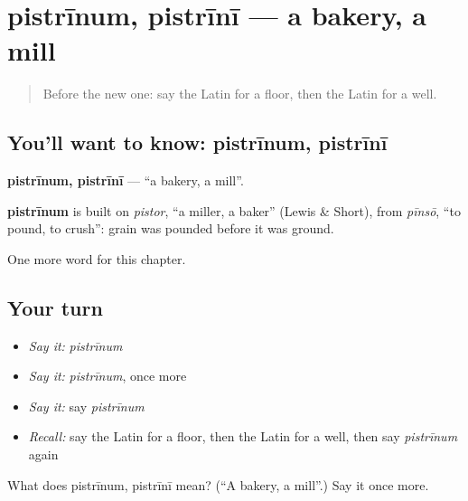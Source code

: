 \section[pistrīnum, pistrīnī]{pistrīnum, pistrīnī — a bakery, a mill}

\label{lesson:LA-C118-pistrinum}



\begin{quote}
Before the new one: say the Latin for a floor, then the Latin for a well.
\end{quote}

\subsection*{You'll want to know: pistrīnum, pistrīnī}
\textbf{pistrīnum, pistrīnī} — \textquotedblleft{}a bakery, a mill\textquotedblright{}.

\begin{cousinweb}
\textbf{pistrīnum} is built on \emph{pistor}, \textquotedblleft{}a miller, a baker\textquotedblright{} (Lewis \& Short), from \emph{pīnsō}, \textquotedblleft{}to pound, to crush\textquotedblright{}: grain was pounded before it was ground.
\end{cousinweb}

\begin{grammarlens}[title={What you've built}]
One more word for this chapter.
\end{grammarlens}

\subsection*{Your turn}
\begin{itemize}
\raggedright
  \item \emph{Say it:} \emph{pistrīnum}
  \item \emph{Say it:} \emph{pistrīnum}, once more
  \item \emph{Say it:} say \emph{pistrīnum}
  \item \emph{Recall:} say the Latin for a floor, then the Latin for a well, then say \emph{pistrīnum} again
\end{itemize}

\begin{tcolorbox}[breakable,colback=teal!4,colframe=teal!35!black,title={Before you move on}]
What does pistrīnum, pistrīnī mean? (\textquotedblleft{}A bakery, a mill\textquotedblright{}.) Say it once more.
\end{tcolorbox}
